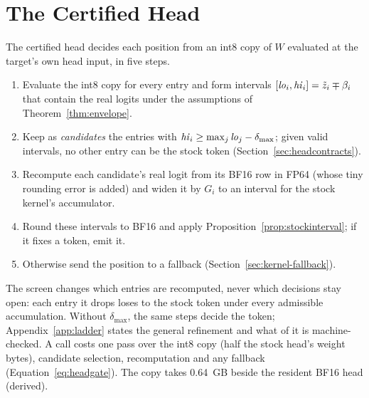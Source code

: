 \section{The Certified Head}\label{sec:selfevidence}\label{sec:head}
The certified head decides each position from an int8 copy of $W$ evaluated at the target's own head input, in five steps.\label{sec:ladder}
\begin{enumerate}[leftmargin=1.4em]
\item Evaluate the int8 copy for every entry and form intervals $[\mathit{lo}_i,\mathit{hi}_i]=\tilde z_i\mp\beta_i$ that contain the real logits under the assumptions of Theorem~\ref{thm:envelope}.
\item Keep as \emph{candidates} the entries with $\mathit{hi}_i\ge\max_j\mathit{lo}_j-\delta_{\max}$; given valid intervals, no other entry can be the stock token (Section~\ref{sec:headcontracts}).
\item Recompute each candidate's real logit from its BF16 row in FP64 (whose tiny rounding error is added) and widen it by $G_i$ to an interval for the stock kernel's accumulator.
\item Round these intervals to BF16 and apply Proposition~\ref{prop:stockinterval}; if it fixes a token, emit it.
\item Otherwise send the position to a fallback (Section~\ref{sec:kernel-fallback}).
\end{enumerate}
The screen changes which entries are recomputed, never which decisions stay open: each entry it drops loses to the stock token under every admissible accumulation. Without $\delta_{\max}$, the same steps decide the \Rreal{} token; Appendix~\ref{app:ladder} states the general refinement and what of it is machine-checked. A call costs one pass over the int8 copy (half the stock head's weight bytes), candidate selection, recomputation and any fallback (Equation~\ref{eq:headgate}). The copy takes 0.64~GB beside the resident BF16 head (derived).

